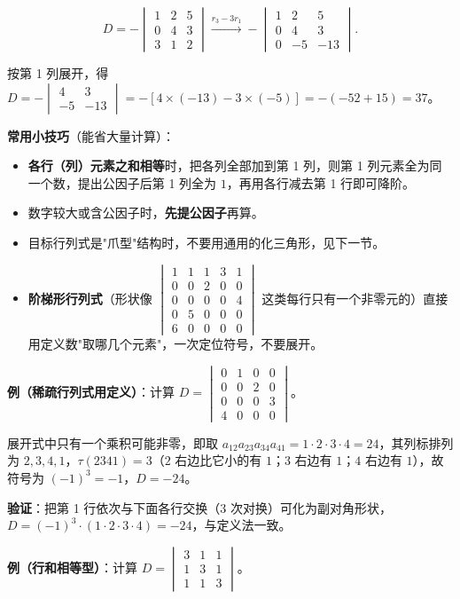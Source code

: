 \documentclass[11pt,openany,UTF8]{ctexbook}
\begin{document}
\[D=-\begin{vmatrix}1&2&5\\0&4&3\\3&1&2\end{vmatrix}\xrightarrow{r_3-3r_1}-\begin{vmatrix}1&2&5\\0&4&3\\0&-5&-13\end{vmatrix}.\]

按第 1 列展开，得 $D=-\begin{vmatrix}4&3\\-5&-13\end{vmatrix}=-[4\times(-13)-3\times(-5)]=-(-52+15)=37$。

\textbf{常用小技巧}（能省大量计算）：

\begin{itemize}
\item \textbf{各行（列）元素之和相等}时，把各列全部加到第 1 列，则第 1 列元素全为同一个数，提出公因子后第 1 列全为 $1$，再用各行减去第 1 行即可降阶。
\item 数字较大或含公因子时，\textbf{先提公因子}再算。
\item 目标行列式是"爪型"结构时，不要用通用的化三角形，见下一节。
\item \textbf{阶梯形行列式}（形状像 $\begin{vmatrix}1&1&1&3&1\\0&0&2&0&0\\0&0&0&0&4\\0&5&0&0&0\\6&0&0&0&0\end{vmatrix}$ 这类每行只有一个非零元的）直接用定义数"取哪几个元素"，一次定位符号，不要展开。
\end{itemize}
\textbf{例（稀疏行列式用定义）}：计算 $D=\begin{vmatrix}0&1&0&0\\0&0&2&0\\0&0&0&3\\4&0&0&0\end{vmatrix}$。

展开式中只有一个乘积可能非零，即取 $a_{12}a_{23}a_{34}a_{41}=1\cdot2\cdot3\cdot4=24$，其列标排列为 $2,3,4,1$，$\tau(2341)=3$（$2$ 右边比它小的有 $1$；$3$ 右边有 $1$；$4$ 右边有 $1$），故符号为 $(-1)^3=-1$，$D=-24$。

\textbf{验证}：把第 1 行依次与下面各行交换（$3$ 次对换）可化为副对角形状，$D=(-1)^3\cdot(1\cdot2\cdot3\cdot4)=-24$，与定义法一致。

\textbf{例（行和相等型）}：计算 $D=\begin{vmatrix}3&1&1\\1&3&1\\1&1&3\end{vmatrix}$。
\end{document}
